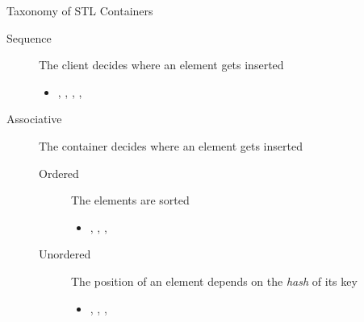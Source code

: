 \begin{frame}{Taxonomy of STL Containers}

  \begin{description}
  \item[Sequence] The client decides where an element gets inserted
    \begin{itemize}
    \item {}, , , , 
    \end{itemize}
  \item[Associative] The container decides where an element gets
    inserted
    \begin{description}
    \item[Ordered] The elements are sorted
      \begin{itemize}
      \item {}, , , 
      \end{itemize}
    \item[Unordered] The position of an element depends on the \textit{hash} of
      its key
      \begin{itemize}
      \item {}, ,
        , 
      \end{itemize}
    \end{description}
  \end{description}

\end{frame}

